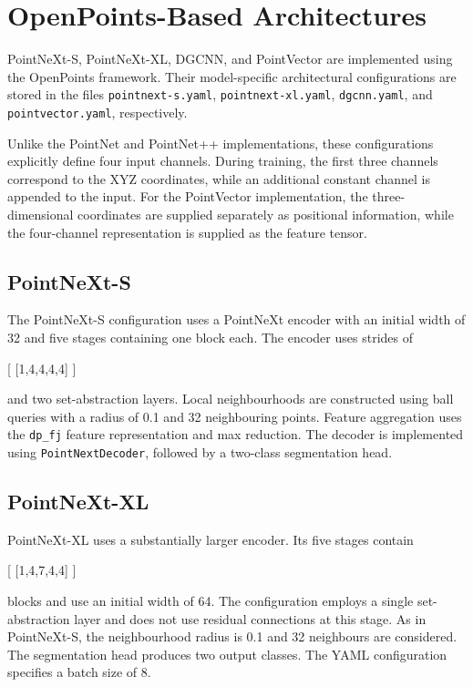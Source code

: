 \section{OpenPoints-Based Architectures}
\label{app:openpoints_configuration}

PointNeXt-S, PointNeXt-XL, DGCNN, and PointVector are implemented using the OpenPoints framework. Their model-specific architectural configurations are stored in the files \texttt{pointnext-s.yaml}, \texttt{pointnext-xl.yaml}, \texttt{dgcnn.yaml}, and \texttt{pointvector.yaml}, respectively.

Unlike the PointNet and PointNet++ implementations, these configurations explicitly define four input channels. During training, the first three channels correspond to the XYZ coordinates, while an additional constant channel is appended to the input. For the PointVector implementation, the three-dimensional coordinates are supplied separately as positional information, while the four-channel representation is supplied as the feature tensor.

\subsection{PointNeXt-S}

The PointNeXt-S configuration uses a PointNeXt encoder with an initial width of 32 and five stages containing one block each. The encoder uses strides of

[
[1,4,4,4,4]
]

and two set-abstraction layers. Local neighbourhoods are constructed using ball queries with a radius of 0.1 and 32 neighbouring points. Feature aggregation uses the \texttt{dp\_fj} feature representation and max reduction. The decoder is implemented using \texttt{PointNextDecoder}, followed by a two-class segmentation head.

\subsection{PointNeXt-XL}

PointNeXt-XL uses a substantially larger encoder. Its five stages contain

[
[1,4,7,4,4]
]

blocks and use an initial width of 64. The configuration employs a single set-abstraction layer and does not use residual connections at this stage. As in PointNeXt-S, the neighbourhood radius is 0.1 and 32 neighbours are considered. The segmentation head produces two output classes. The YAML configuration specifies a batch size of 8.

